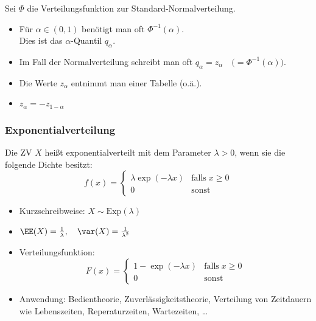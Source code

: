  Sei $\Phi$ die Verteilungsfunktion zur Standard-Normalverteilung.
\begin{itemize}
\item Für $\alpha \in (0,1)$ benötigt man oft $\Phi^{-1}(\alpha)$.\\
Dies ist das $\alpha$-Quantil $q_\alpha$.
\item Im Fall der Normalverteilung schreibt man oft $q_\alpha = z_\alpha \quad\Big(=\Phi^{-1}(\alpha)\Big)$.
\item Die Werte $z_\alpha$ entnimmt man einer Tabelle (o.ä.).
\item $z_\alpha = - z_{1-\alpha}$
\end{itemize}

\subsubsection{Exponentialverteilung}
 Die ZV $X$ heißt exponentialverteilt mit dem Parameter $\lambda >0$, wenn sie die folgende Dichte besitzt:
$$f(x)=\begin{cases}
\lambda \exp(-\lambda x) & \mathrm{falls} \; x\geq 0\\
0 & \mathrm{sonst}
\end{cases}
$$
\begin{itemize}
\item Kurzschreibweise: $X\sim \mathrm{Exp}(\lambda)$
\item $\EE(X)=\frac{1}{\lambda}, \quad \var(X)=\frac{1}{\lambda^2}$
\item Verteilungsfunktion:
$$F(x)=\begin{cases}
1-\exp(-\lambda x) & \mathrm{falls}\; x \geq 0\\
0 & \mathrm{sonst}
\end{cases}$$
\item Anwendung: Bedientheorie, Zuverlässigkeitstheorie, Verteilung von Zeitdauern wie Lebenszeiten, Reperaturzeiten, Wartezeiten, …
\end{itemize}





